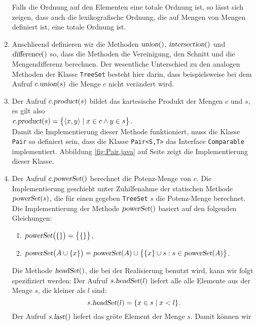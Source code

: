 \begin{enumerate}
      Falls die Ordnung auf den Elementen eine totale Ordnung ist, so l\"asst sich zeigen,
      dass auch die lexikografische Ordnung, die auf Mengen von Mengen definiert ist, eine
      totale Ordnung ist. 
\item Anschlie\3end definieren wir die Methoden 
      $\textsl{union}()$,
      $\textsl{intersection}()$ und
      $\textsl{difference}()$ so, dass die Methoden  die Vereinigung, den Schnitt und die
      Mengendifferenz berechnen.  Der wesentliche Unterschied zu den analogen Methoden der
      Klasse \texttt{TreeSet} besteht hier darin, dass beispielsweise bei dem Aufruf 
      $c.\textsl{union}(s)$ die Menge $c$ nicht ver\"andert wird.
\item Der Aufruf $c.\textsl{product}(s)$ bildet das kartesische Produkt der Mengen
      $c$ und $s$, es gilt also 
      \\[0.2cm]
      \hspace*{1.3cm}
      $c.\textsl{product}(s) = \bigl\{ \pair(x,y) \mid x \in c \wedge y \in s \bigr\}$.
      \\[0.2cm]
      Damit die Implementierung dieser Methode funktioniert,  muss die Klasse \texttt{Pair} so definiert
      sein, dass die Klasse \texttt{Pair<S,T>} das Interface \texttt{Comparable} implementiert.
      Abbildung  \ref{fig:Pair.java} auf Seite \pageref{fig:Pair.java} zeigt die Implementierung dieser Klasse.
\item Der Aufruf $c.\textsl{powerSet}()$ berechnet die Potenz-Menge von $c$.
      Die Implementierung geschieht unter Zuhilfenahme der statischen Methode
      $\textsl{powerSet}(s)$, die f\"ur einen gegeben \texttt{TreeSet} $s$ die Potenz-Menge 
      berechnet. Die Implementierung der Methode $\textsl{powerSet}()$ basiert auf den folgenden Gleichungen:
      \begin{enumerate}
      \item $\textsl{powerSet}\bigl(\{\}\bigr) = \bigl\{ \{\} \bigr\}$,
      \item $\textsl{powerSet}\bigl(A \cup \{x\} \bigr) = 
             \textsl{powerSet}(A) \cup \bigl\{ \{x\} \cup s : s \in \textsl{powerSet}(A) \bigr\}$.
      \end{enumerate}
      Die Methode $\textsl{headSet}()$, die bei der Realisierung benutzt wird, kann wir
      folgt spezifiziert werden: Der Aufruf $s.\textsl{headSet}(l)$ liefert alle alle
      Elemente aus der Menge $s$, die kleiner als $l$ sind:
      \[ s.\textsl{headSet}(l) = \{ x \in s \mid x < l \}. \]
      Der Aufruf $s.\textsl{last}()$ liefert das gr\"o\3te Element der Menge $s$.  Damit k\"onnen wir

\end{enumerate}
